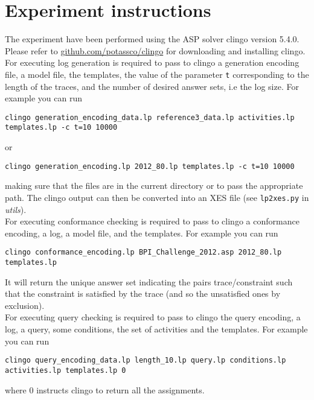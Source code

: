 \section{Experiment instructions}
The experiment have been performed using the ASP solver  clingo version 5.4.0. Please refer to \url{github.com/potassco/clingo} for downloading and installing clingo. \\

For executing log generation is required to pass to clingo a generation encoding file, a model file, the templates, the value of the parameter \texttt{t} corresponding to the length of the traces, and the number of desired answer sets, i.e the log size. For example you can run

\texttt{clingo generation\_encoding\_data.lp reference3\_data.lp activities.lp templates.lp -c t=10 10000}

or

\texttt{clingo generation\_encoding.lp 2012\_80.lp templates.lp -c t=10 10000}

making sure that the files are in the current directory or to pass the appropriate path. The clingo output can then be converted into an XES file (see \texttt{lp2xes.py} in \emph{utils}).\\

For executing conformance checking is required to pass to clingo a conformance encoding, a log, a model file, and the templates. For example you can run

\texttt{clingo conformance\_encoding.lp  BPI\_Challenge\_2012.asp 2012\_80.lp templates.lp}

It will return the unique answer set indicating the pairs trace/constraint such that the constraint is satisfied by the trace (and so the unsatisfied ones by exclusion).\\

For executing query checking is required to pass to clingo the query encoding, a log, a query, some conditions, the set of activities and the templates. For example you can run 

\texttt{clingo  query\_encoding\_data.lp  length\_10.lp query.lp conditions.lp activities.lp templates.lp 0}

where 0 instructs clingo to return all the assignments.

